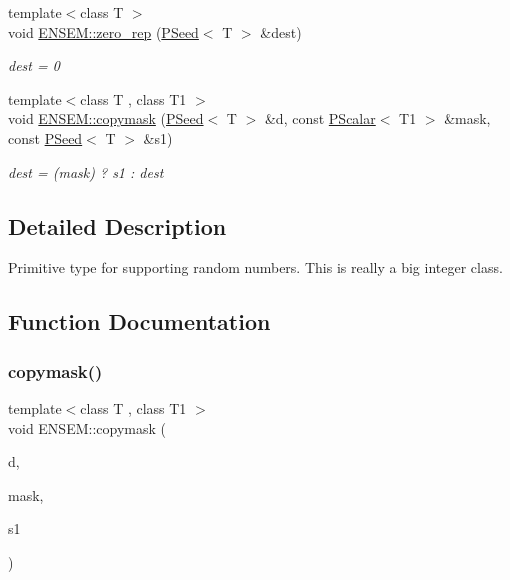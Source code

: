 \begin{DoxyCompactItemize}
\item 
{\footnotesize template$<$class T $>$ }\\void \mbox{\hyperlink{group__primseed_ga7f820f9e98c02626f49ea005894fdc65}{E\+N\+S\+E\+M\+::zero\+\_\+rep}} (\mbox{\hyperlink{classENSEM_1_1PSeed}{P\+Seed}}$<$ T $>$ \&dest)
\begin{DoxyCompactList}\small\item\em dest = 0 \end{DoxyCompactList}\item 
{\footnotesize template$<$class T , class T1 $>$ }\\void \mbox{\hyperlink{group__primseed_gaa67a317a379bde0b069fba2359e59e2e}{E\+N\+S\+E\+M\+::copymask}} (\mbox{\hyperlink{classENSEM_1_1PSeed}{P\+Seed}}$<$ T $>$ \&d, const \mbox{\hyperlink{classENSEM_1_1PScalar}{P\+Scalar}}$<$ T1 $>$ \&mask, const \mbox{\hyperlink{classENSEM_1_1PSeed}{P\+Seed}}$<$ T $>$ \&s1)
\begin{DoxyCompactList}\small\item\em dest = (mask) ? s1 \+: dest \end{DoxyCompactList}\end{DoxyCompactItemize}


\subsection{Detailed Description}
Primitive type for supporting random numbers. This is really a big integer class. 

\subsection{Function Documentation}
\mbox{\label{group__primseed_gaa67a317a379bde0b069fba2359e59e2e}} 
\subsubsection{\texorpdfstring{copymask()}{copymask()}}
{\footnotesize\ttfamily template$<$class T , class T1 $>$ \\
void E\+N\+S\+E\+M\+::copymask (\begin{DoxyParamCaption}\item[{\mbox{\hyperlink{classENSEM_1_1PSeed}{P\+Seed}}$<$ T $>$ \&}]{d,  }\item[{const \mbox{\hyperlink{classENSEM_1_1PScalar}{P\+Scalar}}$<$ T1 $>$ \&}]{mask,  }\item[{const \mbox{\hyperlink{classENSEM_1_1PSeed}{P\+Seed}}$<$ T $>$ \&}]{s1 }\end{DoxyParamCaption})\hspace{0.3cm}{\ttfamily [inline]}}



